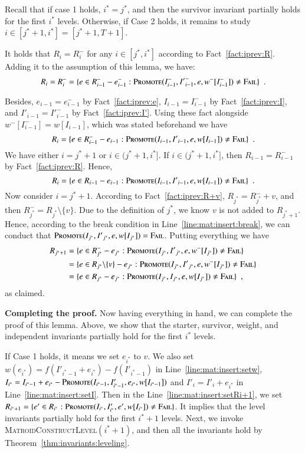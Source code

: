 \documentclass[11pt]{article}
\newcommand{\err}{{\textsc{Fail}}}
\newcommand{\MatroidConstLevel}{\textsc{MatroidConstructLevel}}
\newcommand{\replacementTester}{\textsc{Promote}}
\begin{document}
Recall that if case 1 holds, $i^*=j^*$, and then the survivor invariant partially holds for the first $i^*$ levels.
Otherwise, if Case 2 holds, it remains to study $i\in [j^*+1, i^*]=[j^*+1,T+1]$.

It holds that $R_i = R_i^-$ for any $i \in [j^*, i^*]$  according to Fact~\ref{fact:iprev:R}. Adding  it to the assumption of this lemma, we have: 
$$
    R_i = R_i^-
    = \{ e \in R_{i-1}^- - e_{i-1}^-: \replacementTester{}(I_{i-1}^-, {I'}_{i-1}^-, e, w^-[I_{i-1}^-]) \ne \err\} \enspace .
$$

Besides, $e_{i-1}=e_{i-1}^-$ by Fact~\ref{fact:iprev:e}, $I_{i-1}=I_{i-1}^-$ by Fact~\ref{fact:iprev:I}, and ${I'}_{i-1}={I'}_{i-1}^-$ by Fact~\ref{fact:iprev:I'}. Using these fact alongside $w^-[I_{i - 1}^-] = w[I_{i - 1}]$, which was stated beforehand we have
$$
    R_i
    = \{ e \in R_{i-1}^- - e_{i-1}: \replacementTester{}(I_{i-1}, {I'}_{i-1}, e, w[I_{i-1}]) \ne \err\} \enspace .
$$
We have either $i=j^*+1$ or $i\in (j^*+1, i^*]$. If $i\in (j^*+1, i^*]$, then $R_{i - 1}=R_{i - 1}^-$ by Fact~\ref{fact:iprev:R}. Hence,
$$
    R_i
    = \{ e \in R_{i-1} - e_{i-1}: \replacementTester{}(I_{i-1}, {I'}_{i-1}, e, w[I_{i-1}]) \ne \err\} \enspace .
$$
Now consider $i=j^*+1$. According to Fact~\ref{fact:iprev:R+v}, $R_{j^*}=R_{j^*}^-+v$, and then $R_{j^*}^-=R_{j^*}\setminus\{v\}$. Due to the definition of $j^*$, we know $v$ is not added to $R_{j^*+1}$. Hence, according to the break condition in Line~\ref{line:mat:insert:break}, we can conduct that  $\replacementTester{}(I_{j^*}, {I'}_{j^*}, e, w[I_{j^*}]) = \err$. 
Putting everything we have
\begin{align*}
    R_{j^*+1} &= \{ e \in R_{j^*}^- - e_{j^*}: \replacementTester{}(I_{j^*}, {I'}_{j^*}, e, w^-[I_{j^*}]) \ne \err\} \\
     &= \{ e \in R_{j^*} \backslash \{v\} - e_{j^*}: \replacementTester{}(I_{j^*}, {I'}_{j^*}, e, w^-[I_{j^*}]) \ne \err\} \\
    &= \{ e \in R_{j^*} - e_{j^*}: \replacementTester{}(I_{j^*}, {I}_{j^*}, e, w[I_{j^*}]) \ne \err\} \enspace ,
\end{align*}
as claimed.


\textbf{Completing the proof.}
Now having everything in hand, we can complete the proof of this lemma. Above, we show that the starter, survivor, weight, and independent invariants partially hold for the first $i^*$ levels.

If Case 1 holds, it means we set $e_{i^*}$ to $v$. 
We also set $w(e_{i^*}) = f(I'_{i^* - 1} + e_{i^*}) - f(I'_{i^* -1})$ in Line~\ref{line:mat:insert:setw},
$I_{i^*} = I_{i^*-1} + e_{i^*} - \replacementTester{}(I_{i^*-1}, I'_{i^*-1}, e_{i^*}, w[I_{i^* - 1}])$
and $I'_i = I'_i + e_{i^*}$ in Line~\ref{line:mat:insert:setI}.
Then in the Line~\ref{line:mat:insert:setRi+1},
we set $R_{i^*+1} = \{e' \in R_{i^*}: \replacementTester{}(I_{i^*}, I'_{i^*}, e',w[I_{i^*}]) \ne \err \}$.
It implies that the level invariants partially hold for the first $i^*+1$ levels.
Next, we invoke \MatroidConstLevel$(i^*+1)$, and then all the invariants hold by Theorem~\ref{thm:invariants:leveling}. 
\end{document}
